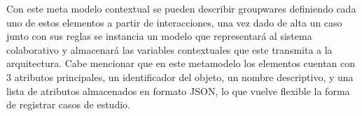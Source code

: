 Con este meta modelo contextual se pueden describir groupwares definiendo cada uno de estos elementos a partir de interacciones, una vez dado de alta un caso junto con sus reglas se instancia un modelo que representar\'a al sistema colaborativo y almacenar\'a las variables contextuales que este transmita a la arquitectura. Cabe mencionar que en este metamodelo los elementos cuentan con 3 atributos principales, un identificador del objeto, un nombre descriptivo, y una lista de atributos almacenados en formato JSON, lo que vuelve flexible la forma de registrar casos de estudio.